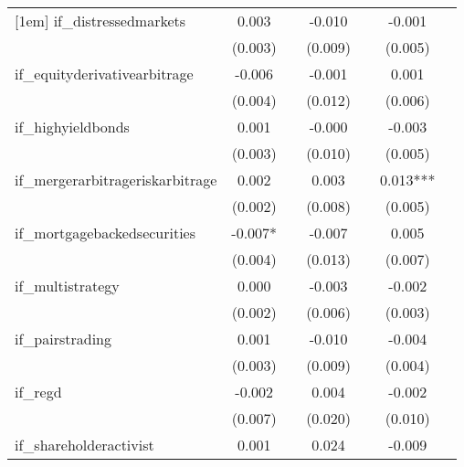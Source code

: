 {\begin{tabular}{l*{6}{c}}
[1em]
if\_distressedmarkets&       0.003   &               &      -0.010   &               &      -0.001   &               \\
            &     (0.003)   &               &     (0.009)   &               &     (0.005)   &               \\
[1em]
if\_equityderivativearbitrage&      -0.006   &               &      -0.001   &               &       0.001   &               \\
            &     (0.004)   &               &     (0.012)   &               &     (0.006)   &               \\
[1em]
if\_highyieldbonds&       0.001   &               &      -0.000   &               &      -0.003   &               \\
            &     (0.003)   &               &     (0.010)   &               &     (0.005)   &               \\
[1em]
if\_mergerarbitrageriskarbitrage&       0.002   &               &       0.003   &               &       0.013***&               \\
            &     (0.002)   &               &     (0.008)   &               &     (0.005)   &               \\
[1em]
if\_mortgagebackedsecurities&      -0.007*  &               &      -0.007   &               &       0.005   &               \\
            &     (0.004)   &               &     (0.013)   &               &     (0.007)   &               \\
[1em]
if\_multistrategy&       0.000   &               &      -0.003   &               &      -0.002   &               \\
            &     (0.002)   &               &     (0.006)   &               &     (0.003)   &               \\
[1em]
if\_pairstrading&       0.001   &               &      -0.010   &               &      -0.004   &               \\
            &     (0.003)   &               &     (0.009)   &               &     (0.004)   &               \\
[1em]
if\_regd     &      -0.002   &               &       0.004   &               &      -0.002   &               \\
            &     (0.007)   &               &     (0.020)   &               &     (0.010)   &               \\
[1em]
if\_shareholderactivist&       0.001   &               &       0.024   &               &      -0.009   &               \\

\end{tabular}}
